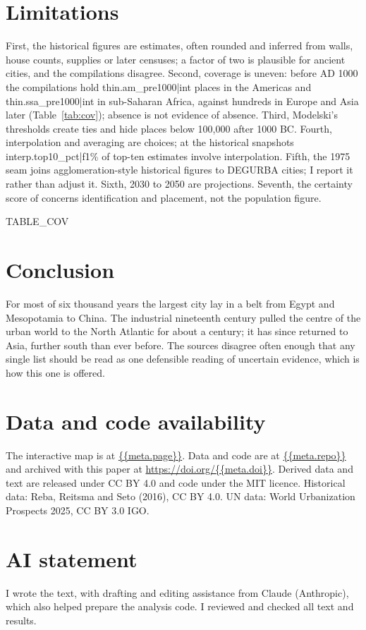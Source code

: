 \documentclass[11pt,a4paper]{article}
\begin{document}
\section{Limitations}
First, the historical figures are estimates, often rounded and inferred from walls, house counts, supplies or later censuses; a factor of two is plausible for ancient cities, and the compilations disagree. Second, coverage is uneven: before AD 1000 the compilations hold {{thin.am_pre1000|int}} places in the Americas and {{thin.ssa_pre1000|int}} in sub-Saharan Africa, against hundreds in Europe and Asia later (Table~\ref{tab:cov}); absence is not evidence of absence. Third, Modelski's thresholds create ties and hide places below 100,000 after 1000 BC. Fourth, interpolation and averaging are choices; at the historical snapshots {{interp.top10_pct|f1}}\% of top-ten estimates involve interpolation. Fifth, the 1975 seam joins agglomeration-style historical figures to DEGURBA cities; I report it rather than adjust it. Sixth, 2030 to 2050 are projections. Seventh, the certainty score of \citet{reba} concerns identification and placement, not the population figure.

{{TABLE_COV}}

\section{Conclusion}
For most of six thousand years the largest city lay in a belt from Egypt and Mesopotamia to China. The industrial nineteenth century pulled the centre of the urban world to the North Atlantic for about a century; it has since returned to Asia, further south than ever before. The sources disagree often enough that any single list should be read as one defensible reading of uncertain evidence, which is how this one is offered.

\section*{Data and code availability}
The interactive map is at \url{{{meta.page}}}. Data and code are at \url{{{meta.repo}}} and archived with this paper at \url{https://doi.org/{{meta.doi}}}. Derived data and text are released under CC BY 4.0 and code under the MIT licence. Historical data: Reba, Reitsma and Seto (2016), CC BY 4.0. UN data: World Urbanization Prospects 2025, CC BY 3.0 IGO.

\section*{AI statement}
I wrote the text, with drafting and editing assistance from Claude (Anthropic), which also helped prepare the analysis code. I reviewed and checked all text and results.
\end{document}
